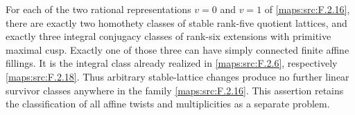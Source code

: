 \begin{theorem}\label{maps:src:F.2.23}


For each of the two rational representations $v=0$ and $v=1$
of \ref{maps:src:F.2.16}, there are exactly two homothety classes of stable
rank-five quotient lattices, and exactly three integral
conjugacy classes of rank-six extensions with primitive
maximal cusp.  Exactly one of those three can have simply
connected finite affine fillings.  It is the integral class
already realized in \ref{maps:src:F.2.6}, respectively \ref{maps:src:F.2.18}.
Thus arbitrary stable-lattice changes produce no further
linear survivor classes anywhere in the family \ref{maps:src:F.2.16}.
This assertion retains the classification of all affine
twists and multiplicities as a separate problem.

\end{theorem}


